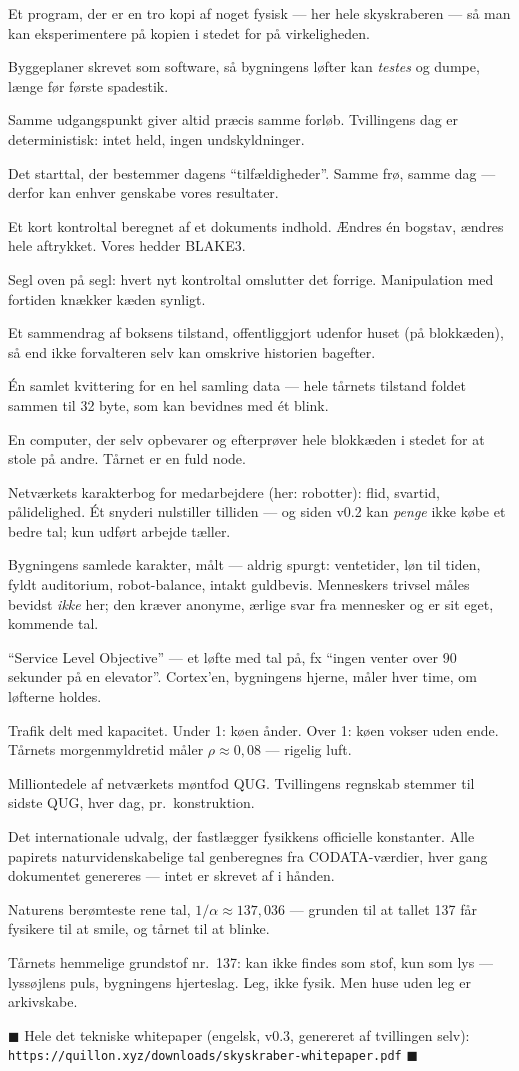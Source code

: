 \documentclass[11pt,a4paper]{article}
\newcommand{\glose}[1]{\item[\textcolor{qsteel}{\textbf{#1}}]}
\begin{document}
\begin{description}\setlength\itemsep{2pt}
\glose{Digital tvilling} Et program, der er en tro kopi af noget fysisk --- her
hele skyskraberen --- så man kan eksperimentere på kopien i stedet for på
virkeligheden.
\glose{Eksekverbar arkitektur} Byggeplaner skrevet som software, så bygningens
løfter kan \emph{testes} og dumpe, længe før første spadestik.
\glose{Deterministisk} Samme udgangspunkt giver altid præcis samme forløb.
Tvillingens dag er deterministisk: intet held, ingen undskyldninger.
\glose{Frø (seed)} Det starttal, der bestemmer dagens ``tilfældigheder''.
Samme frø, samme dag --- derfor kan enhver genskabe vores resultater.
\glose{Fingeraftryk (hash)} Et kort kontroltal beregnet af et dokuments
indhold. Ændres én bogstav, ændres hele aftrykket. Vores hedder BLAKE3.
\glose{Hash-kæde} Segl oven på segl: hvert nyt kontroltal omslutter det
forrige. Manipulation med fortiden knækker kæden synligt.
\glose{Anker / bevidnet} Et sammendrag af boksens tilstand, offentliggjort
udenfor huset (på blokkæden), så end ikke forvalteren selv kan omskrive
historien bagefter.
\glose{Merkle-rod} Én samlet kvittering for en hel samling data --- hele
tårnets tilstand foldet sammen til 32 byte, som kan bevidnes med ét blink.
\glose{Fuld node} En computer, der selv opbevarer og efterprøver hele
blokkæden i stedet for at stole på andre. Tårnet er en fuld node.
\glose{SAP-score} Netværkets karakterbog for medarbejdere (her: robotter):
flid, svartid, pålidelighed. Ét snyderi nulstiller tilliden --- og siden v0.2
kan \emph{penge} ikke købe et bedre tal; kun udført arbejde tæller.
\glose{Driftsindeks (BOI)} Bygningens samlede karakter, målt --- aldrig
spurgt: ventetider, løn til tiden, fyldt auditorium, robot-balance, intakt
guldbevis. Menneskers trivsel måles bevidst \emph{ikke} her; den kræver
anonyme, ærlige svar fra mennesker og er sit eget, kommende tal.
\glose{SLO} ``Service Level Objective'' --- et løfte med tal på, fx ``ingen
venter over 90 sekunder på en elevator''. Cortex'en, bygningens hjerne, måler
hver time, om løfterne holdes.
\glose{$\rho$ (belastningsgrad)} Trafik delt med kapacitet. Under 1: køen
ånder. Over 1: køen vokser uden ende. Tårnets morgenmyldretid måler
$\rho \approx 0{,}08$ --- rigelig luft.
\glose{\textmu QUG} Milliontedele af netværkets møntfod QUG. Tvillingens
regnskab stemmer til sidste \textmu QUG, hver dag, pr.\ konstruktion.
\glose{CODATA} Det internationale udvalg, der fastlægger fysikkens officielle
konstanter. Alle papirets naturvidenskabelige tal genberegnes fra CODATA-værdier,
hver gang dokumentet genereres --- intet er skrevet af i hånden.
\glose{Fintstrukturkonstanten ($\alpha$)} Naturens berømteste rene tal,
$1/\alpha \approx 137{,}036$ --- grunden til at tallet 137 får fysikere til at
smile, og tårnet til at blinke.
\glose{Quillonium} Tårnets hemmelige grundstof nr.\ 137: kan ikke findes som
stof, kun som lys --- lyssøjlens puls, bygningens hjerteslag. Leg, ikke fysik.
Men huse uden leg er arkivskabe.
\end{description}

\begin{center}
\vspace{6pt}
\textcolor{qgold}{$\blacksquare$}\quad
Hele det tekniske whitepaper (engelsk, v0.3, genereret af tvillingen selv):\\
\texttt{https://quillon.xyz/downloads/skyskraber-whitepaper.pdf}\quad
\textcolor{qgold}{$\blacksquare$}
\end{center}
\end{document}
